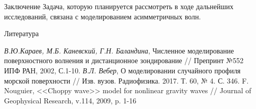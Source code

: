 \begin{frame}[t]{}
\begin{columns}[t]
\begin{column}{.48\linewidth}
\begin{block}{Заключение}
Задача, которую планируется рассмотреть в ходе дальнейших исследований, связана с моделированием асимметричных волн.
        \end{block}
        \begin{block}{Литература}
            \footnotesize
            \begin{thebibliography}{}
                 \textit{В.Ю.Караев, М.Б. Каневский, Г.Н. Баландина}, Численное моделирование поверхностного волнения и дистанционное зондирование // Препринт №552 ИПФ РАН, 2002, С.1-10.
                 \textit{В.Л. Вебер}, О моделировании случайного профиля морской поверхности // Изв. вузов. Радиофизика. 2017. Т. 60, № 4. С. 346.
                 F. Nouguier, <<Choppy wave>> model for nonlinear gravity waves // Journal of Geophysical Research, v.114, 2009, p. 1-16
            \end{thebibliography}
        \end{block}
      \end{column}
    \end{columns}
  \end{frame}

